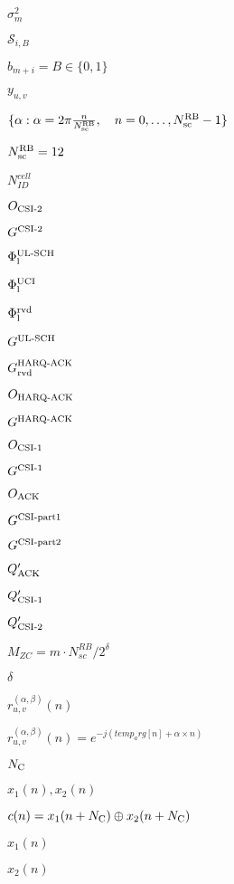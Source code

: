 \documentclass{article}
\begin{document}
$\sigma_m^2$
\pagebreak

$\mathcal{S}_{i,B}$
\pagebreak

$b_{m+i}=B\in\{0,1\}$
\pagebreak

$y_{u,v}$
\pagebreak

$\{\alpha : \alpha = 2 \pi
\frac{n}{N_{\textup{sc}}^{\textup{RB}}}, \quad n = 0, \dots, N_{\textup{sc}}^{\textup{RB}}-1\}$
\pagebreak

$N_{\textup{sc}}^{\textup{RB}} = 12$
\pagebreak

$N_{ID}^{cell}$
\pagebreak

$O_\textup{CSI-2}$
\pagebreak

$G^\textup{CSI-2}$
\pagebreak

$\Phi^\textup{UL-SCH}_\textup{l}$
\pagebreak

$\Phi^\textup{UCI}_\textup{l}$
\pagebreak

$\Phi^\textup{rvd}_\textup{l}$
\pagebreak

$G^\textup{UL-SCH}$
\pagebreak

$G^\textup{HARQ-ACK}_\textup{rvd}$
\pagebreak

$O_\textup{HARQ-ACK}$
\pagebreak

$G^\textup{HARQ-ACK}$
\pagebreak

$O_\textup{CSI-1}$
\pagebreak

$G^\textup{CSI-1}$
\pagebreak

$O_\textup{ACK}$
\pagebreak

$G^\textup{CSI-part1}$
\pagebreak

$G^\textup{CSI-part2}$
\pagebreak

$Q'_\textup{ACK}$
\pagebreak

$Q'_\textup{CSI-1}$
\pagebreak

$Q'_\textup{CSI-2}$
\pagebreak

$M_{ZC}=m \cdot N^{RB}_{sc}/2^\delta$
\pagebreak

$\delta$
\pagebreak

$r^{(\alpha, \beta)}_{u,v}(n)$
\pagebreak

$r^{(\alpha, \beta)}_{u,v}(n) = e^{-j (temp_arg[n] + \alpha \times n)  }$
\pagebreak

$N_{\textup{C}}$
\pagebreak

$x_1(n), x_2(n)$
\pagebreak

$c(n) =
x_1(n + N_{\textup{C}}) \oplus x_2(n + N_{\textup{C}})$
\pagebreak

$x_1(n)$
\pagebreak

$x_2(n)$
\pagebreak
\end{document}
